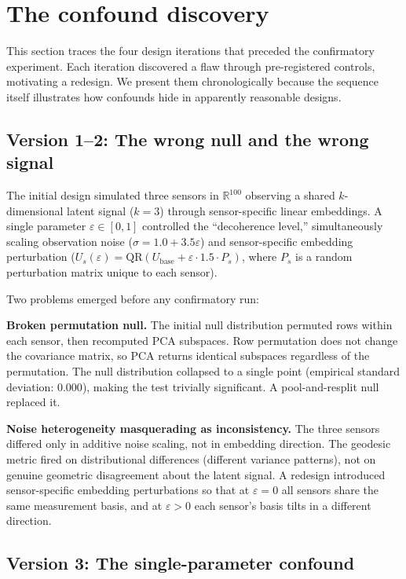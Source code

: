 \documentclass[11pt]{article}
\newcommand{\eps}{\varepsilon}
\begin{document}
\section{The confound discovery}
\label{sec:confound}

This section traces the four design iterations that preceded the
confirmatory experiment.  Each iteration discovered a flaw through
pre-registered controls, motivating a redesign.  We present them
chronologically because the sequence itself illustrates how
confounds hide in apparently reasonable designs.

\subsection{Version 1--2: The wrong null and the wrong signal}
\label{sec:v1v2}

The initial design simulated three sensors in $\mathbb{R}^{100}$
observing a shared $k$-dimensional latent signal ($k = 3$) through
sensor-specific linear embeddings.  A single parameter $\eps \in
[0, 1]$ controlled the ``decoherence level,'' simultaneously
scaling observation noise ($\sigma = 1.0 + 3.5\eps$) and
sensor-specific embedding perturbation ($U_s(\eps) =
\mathrm{QR}(U_\mathrm{base} + \eps \cdot 1.5 \cdot P_s)$, where
$P_s$ is a random perturbation matrix unique to each sensor).

Two problems emerged before any confirmatory run:

\textbf{Broken permutation null.}  The initial null distribution
permuted rows within each sensor, then recomputed PCA subspaces.
Row permutation does not change the covariance matrix, so PCA
returns identical subspaces regardless of the permutation.  The
null distribution collapsed to a single point (empirical standard
deviation: $0.000$), making the test trivially significant.  A
pool-and-resplit null replaced it.

\textbf{Noise heterogeneity masquerading as inconsistency.}  The
three sensors differed only in additive noise scaling, not in
embedding direction.  The geodesic metric fired on distributional
differences (different variance patterns), not on genuine geometric
disagreement about the latent signal.  A redesign introduced
sensor-specific embedding perturbations so that at $\eps = 0$ all
sensors share the same measurement basis, and at $\eps > 0$ each
sensor's basis tilts in a different direction.

\subsection{Version 3: The single-parameter confound}
\label{sec:v3}
\end{document}
